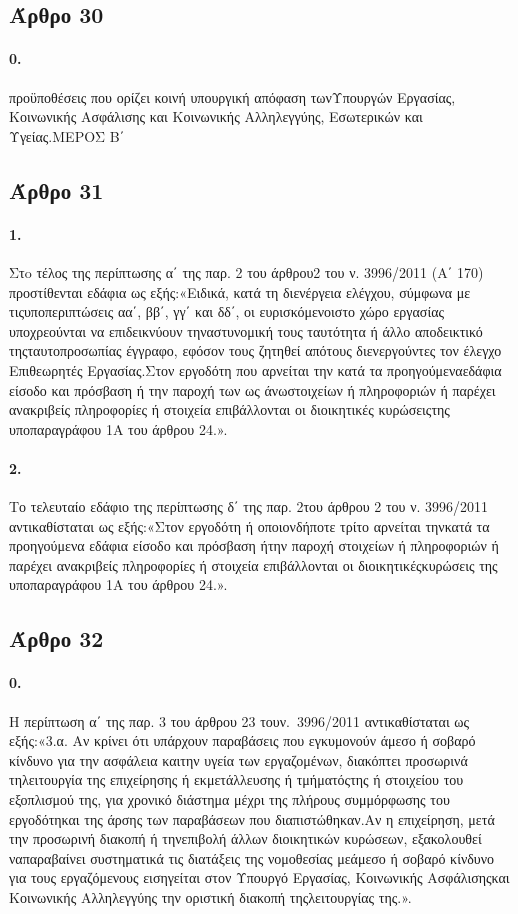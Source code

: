 \documentclass[a4paper,oneside, 10pt]{book}
\begin{document}
\subsection*{ Άρθρο 30 }
\paragraph { 0. } προϋποθέσεις που ορίζει κοινή υπουργική απόφαση τωνΥπουργών Εργασίας, Κοινωνικής Ασφάλισης και Κοινωνικής Αλληλεγγύης, Εσωτερικών και Υγείας.ΜΕΡΟΣ Β΄
\subsection*{ Άρθρο 31 }
\paragraph { 1. } Στo τέλος της περίπτωσης α΄ της παρ. 2 του άρθρου2 του ν. 3996/2011 (Α΄ 170) προστίθενται εδάφια ως εξής:«Ειδικά, κατά τη διενέργεια ελέγχου, σύμφωνα με τιςυποπεριπτώσεις αα΄, ββ΄, γγ΄ και δδ΄, οι ευρισκόμενοιστο χώρο εργασίας υποχρεούνται να επιδεικνύουν τηναστυνομική τους ταυτότητα ή άλλο αποδεικτικό τηςταυτοπροσωπίας έγγραφο, εφόσον τους ζητηθεί απότους διενεργούντες τον έλεγχο Επιθεωρητές Εργασίας.Στον εργοδότη που αρνείται την κατά τα προηγούμεναεδάφια είσοδο και πρόσβαση ή την παροχή των ως άνωστοιχείων ή πληροφοριών ή παρέχει ανακριβείς πληροφορίες ή στοιχεία επιβάλλονται οι διοικητικές κυρώσειςτης υποπαραγράφου 1Α του άρθρου 24.».
\paragraph { 2. } Το τελευταίο εδάφιο της περίπτωσης δ΄ της παρ. 2του άρθρου 2 του ν. 3996/2011 αντικαθίσταται ως εξής:«Στον εργοδότη ή οποιονδήποτε τρίτο αρνείται τηνκατά τα προηγούμενα εδάφια είσοδο και πρόσβαση ήτην παροχή στοιχείων ή πληροφοριών ή παρέχει ανακριβείς πληροφορίες ή στοιχεία επιβάλλονται οι διοικητικέςκυρώσεις της υποπαραγράφου 1Α του άρθρου 24.».
\subsection*{ Άρθρο 32 }
\paragraph { 0. } Η περίπτωση α΄ της παρ. 3 του άρθρου 23 τουν. 3996/2011 αντικαθίσταται ως εξής:«3.α. Αν κρίνει ότι υπάρχουν παραβάσεις που εγκυμονούν άμεσο ή σοβαρό κίνδυνο για την ασφάλεια καιτην υγεία των εργαζομένων, διακόπτει προσωρινά τηλειτουργία της επιχείρησης ή εκμετάλλευσης ή τμήματόςτης ή στοιχείου του εξοπλισμού της, για χρονικό διάστημα μέχρι της πλήρους συμμόρφωσης του εργοδότηκαι της άρσης των παραβάσεων που διαπιστώθηκαν.Αν η επιχείρηση, μετά την προσωρινή διακοπή ή τηνεπιβολή άλλων διοικητικών κυρώσεων, εξακολουθεί ναπαραβαίνει συστηματικά τις διατάξεις της νομοθεσίας μεάμεσο ή σοβαρό κίνδυνο για τους εργαζόμενους εισηγείται στον Υπουργό Εργασίας, Κοινωνικής Ασφάλισηςκαι Κοινωνικής Αλληλεγγύης την οριστική διακοπή τηςλειτουργίας της.».
\end{document}
